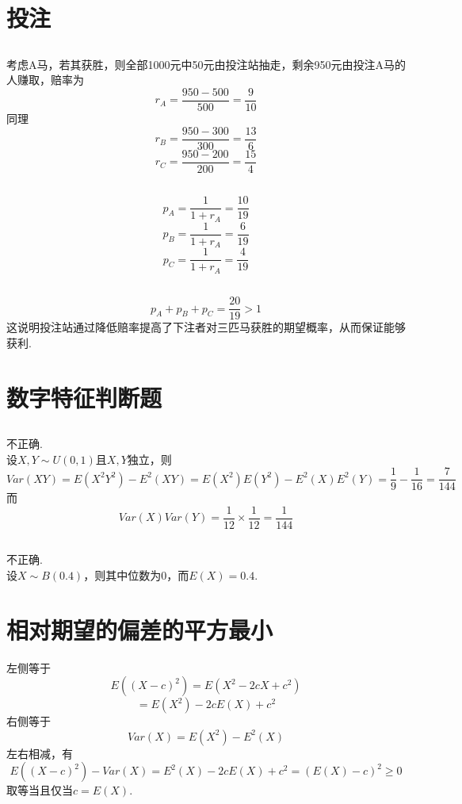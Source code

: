 \documentclass{article}
\begin{document}
\begin{CJK}{UTF8}{gbsn}
\section{投注}
\subsection{}
考虑A马，若其获胜，则全部1000元中50元由投注站抽走，剩余950元由投注A马的人赚取，赔率为
$$ r_{A}=\frac{950-500}{500}=\frac{9}{10}$$
同理
$$ r_{B}=\frac{950-300}{300}=\frac{13}{6}$$
$$ r_{C}=\frac{950-200}{200}=\frac{15}{4}$$
\subsection{}
$$ p_{A}=\frac{1}{1+r_{A}}=\frac{10}{19}$$
$$ p_{B}=\frac{1}{1+r_{A}}=\frac{6}{19}$$
$$ p_{C}=\frac{1}{1+r_{A}}=\frac{4}{19}$$
\subsection{}
$$ p_{A}+p_{B}+p_{C}=\frac{20}{19}>1$$
这说明投注站通过降低赔率提高了下注者对三匹马获胜的期望概率，从而保证能够获利.
\section{数字特征判断题}
\subsection{}
不正确.
\\设$X,Y\sim U(0,1)$且$X,Y$独立，则
$$ Var(XY)=E(X^{2}Y^{2})-E^{2}(XY)=E(X^{2})E(Y^{2})-E^{2}(X)E^{2}(Y)=\frac{1}{9}-\frac{1}{16}=\frac{7}{144}$$
而
$$ Var(X)Var(Y)=\frac{1}{12}\times\frac{1}{12}=\frac{1}{144}$$
\subsection{}
不正确.
\\设$X\sim B(0.4)$，则其中位数为$0$，而$E(X)=0.4$.
\section{相对期望的偏差的平方最小}
左侧等于
$$ E((X-c)^{2})=E(X^{2}-2cX+c^{2})$$
$$ =E(X^{2})-2cE(X)+c^{2}$$
右侧等于
$$ Var(X)=E(X^{2})-E^{2}(X)$$
左右相减，有
$$ E((X-c)^{2})-Var(X)=E^{2}(X)-2cE(X)+c^{2}=(E(X)-c)^{2}\geq 0$$
取等当且仅当$c=E(X)$.

\end{CJK}
\end{document}
